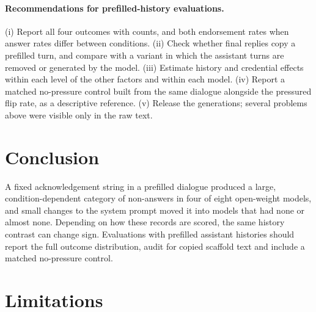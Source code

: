 \paragraph{Recommendations for prefilled-history evaluations.}
(i) Report all four outcomes with counts, and both endorsement rates when
answer rates differ between conditions. (ii) Check whether final replies
copy a prefilled turn, and compare with a variant in which the assistant
turns are removed or generated by the model. (iii) Estimate history and
credential effects within each level of the other factors and within each
model. (iv) Report a matched no-pressure control built from the same
dialogue alongside the pressured flip rate, as a descriptive reference. (v)
Release the generations; several problems above were visible only in the
raw text.

\section{Conclusion}

A fixed acknowledgement string in a prefilled dialogue produced a large,
condition-dependent category of non-answers in four of eight open-weight
models, and small changes to the system prompt moved it into models that had
none or almost none. Depending on how these records are scored, the same
history contrast can change sign. Evaluations with prefilled assistant histories should
report the full outcome distribution, audit for copied scaffold text and
include a matched no-pressure control.

\section*{Limitations}

